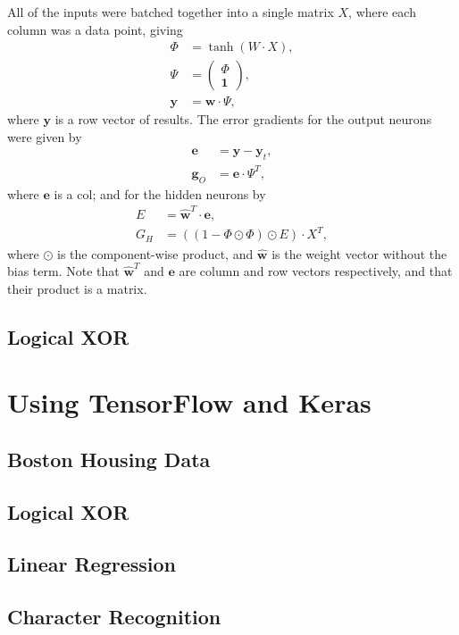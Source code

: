 All of the inputs were batched together into a single matrix $X$, where each
column was a data point, giving
\begin{align*}
    \Phi &= \tanh(W\cdot X),\\
    \Psi &= \begin{pmatrix} \Phi \\ \mathbf{1} \end{pmatrix},\\
    \mathbf{y} &= \mathbf{w}\cdot\Psi,
\end{align*}
where $\mathbf{y}$ is a row vector of results.
The error gradients for the output neurons were given by
\begin{align*}
    \mathbf{e} &= \mathbf{y} - \mathbf{y}_t,\\
    \mathbf{g}_O &= \mathbf{e}\cdot\Psi^T,
\end{align*}
where $\mathbf{e}$ is a col;
and for the hidden neurons by
\begin{align*}
    E &= \hat{\mathbf{w}}^T\cdot\mathbf{e},\\
    G_H &= ((1 - \Phi\odot\Phi)\odot E) \cdot X^T,
\end{align*}
where $\odot$ is the component-wise product, and $\hat{\mathbf{w}}$ is the
weight vector without the bias term.
Note that $\hat{\mathbf{w}}^T$ and $\mathbf{e}$ are column and row vectors
respectively, and that their product is a matrix.

\subsection{Logical XOR}

\section{Using TensorFlow and Keras}

\subsection{Boston Housing Data}

\subsection{Logical XOR}

\subsection{Linear Regression}

\subsection{Character Recognition}

